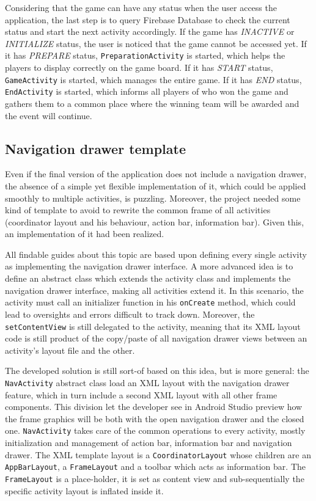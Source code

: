 			Considering that the game can have any status when the user access the application, the last step is to query Firebase Database to check the current status and start the next activity accordingly.
			If the game has \emph{INACTIVE} or \emph{INITIALIZE} status, the user is noticed that the game cannot be accessed yet.
			If it has \emph{PREPARE} status, \lstinline|PreparationActivity| is started, which helps the players to display correctly on the game board.
			If it has \emph{START} status, \lstinline|GameActivity| is started, which manages the entire game.
			If it has \emph{END} status, \lstinline|EndActivity| is started, which informs all players of who won the game and gathers them to a common place where the winning team will be awarded and the event will continue.
		
		\subsection{Navigation drawer template}\label{focus:drawer}
		
			Even if the final version of the application does not include a navigation drawer, the absence of a simple yet flexible implementation of it, which could be applied smoothly to multiple activities, is puzzling.
			Moreover, the project needed some kind of template to avoid to rewrite the common frame of all activities (coordinator layout and his behaviour, action bar, information bar).
			Given this, an implementation of it had been realized.
			
			All findable guides about this topic are based upon defining every single activity as implementing the navigation drawer interface.
			A more advanced idea is to define an abstract class which extends the activity class and implements the navigation drawer interface, making all activities extend it.
			In this scenario, the activity must call an initializer function in his \lstinline|onCreate| method, which could lead to oversights and errors difficult to track down. Moreover, the \lstinline|setContentView| is still delegated to the activity, meaning that its XML layout code is still product of the copy/paste of all navigation drawer views between an activity's layout file and the other.
			
			The developed solution is still sort-of based on this idea, but is more general: the \lstinline|NavActivity| abstract class load an XML layout with the navigation drawer feature, which in turn include a second XML layout with all other frame components.
			This division let the developer see in Android Studio preview how the frame graphics will be both with the open navigation drawer and the closed one.
			\lstinline|NavActivity| takes care of the common operations to every activity, mostly initialization and management of action bar, information bar and navigation drawer.
			The XML template layout is a \lstinline|CoordinatorLayout| whose children are an \lstinline|AppBarLayout|, a \lstinline|FrameLayout| and a toolbar which acts as information bar.
			The \lstinline|FrameLayout| is a place-holder, it is set as content view and sub-sequentially the specific activity layout is inflated inside it.
			
